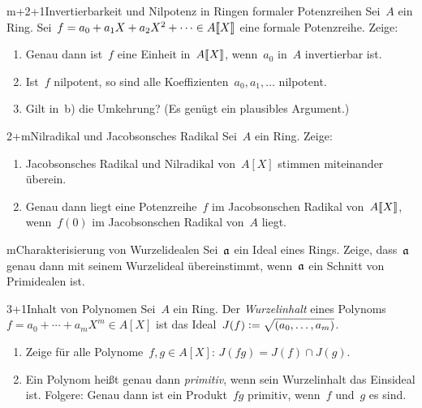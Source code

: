 \documentclass{uebblatt}
\begin{document}

\begin{aufgabe}{m+2+1}{Invertierbarkeit und Nilpotenz in Ringen formaler Potenzreihen}
Sei~$A$ ein Ring. Sei~$f = a_0 + a_1 X + a_2 X^2 + \cdots \in
{A}\llbracket{X}\rrbracket$ eine formale Potenzreihe. Zeige:
\begin{enumerate}
\item Genau dann ist~$f$ eine Einheit in~${A}\llbracket{X}\rrbracket$, wenn~$a_0$ in~$A$ invertierbar
ist.
\item Ist~$f$ nilpotent, so sind alle Koeffizienten~$a_0,a_1,\ldots$ nilpotent.
\item Gilt in~b) die Umkehrung? (Es genügt ein plausibles Argument.)
\end{enumerate}
\end{aufgabe}

\begin{aufgabe}{2+m}{Nilradikal und Jacobsonsches Radikal}
Sei~$A$ ein Ring. Zeige:
\begin{enumerate}
\item Jacobsonsches Radikal und Nilradikal von~$A[X]$ stimmen miteinander überein.
\item Genau dann liegt eine Potenzreihe~$f$ im Jacobsonschen Radikal
von~${A}\llbracket{X}\rrbracket$, wenn~$f(0)$ im Jacobsonschen Radikal von~$A$ liegt.
\end{enumerate}
\end{aufgabe}

\begin{aufgabe}{m}{Charakterisierung von Wurzelidealen}
Sei~$\mathfrak{a}$ ein Ideal eines Rings. Zeige, dass~$\mathfrak{a}$ genau dann mit
seinem Wurzelideal übereinstimmt, wenn~$\mathfrak{a}$ ein Schnitt von Primidealen ist.
\end{aufgabe}

\begin{aufgabe}{3+1}{Inhalt von Polynomen}
Sei~$A$ ein Ring. Der \emph{Wurzelinhalt} eines Polynoms~$f = a_0 + \cdots +
a_m X^m \in A[X]$ ist das Ideal~$J(f) \vcentcolon= \sqrt{(a_0,\ldots,a_m)}$.
\begin{enumerate}
\item Zeige für alle Polynome~$f, g \in A[X]$: $J(fg) = J(f) \cap J(g)$.
\item Ein Polynom heißt genau dann \emph{primitiv}, wenn sein Wurzelinhalt das
Einsideal ist. Folgere: Genau dann ist ein Produkt~$fg$ primitiv, wenn~$f$
und~$g$ es sind.
\end{enumerate}
\end{aufgabe}
\end{document}
